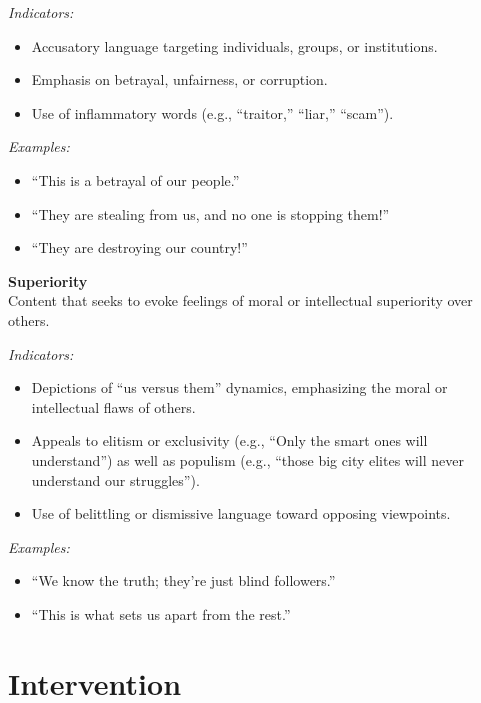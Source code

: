\documentclass[12pt]{article}
\begin{document}
\textit{Indicators:}
\begin{itemize}
    \item Accusatory language targeting individuals, groups, or institutions.
    \item Emphasis on betrayal, unfairness, or corruption.
    \item Use of inflammatory words (e.g., ``traitor,'' ``liar,'' ``scam'').
\end{itemize}

\textit{Examples:}
\begin{itemize}
    \item ``This is a betrayal of our people.''
    \item ``They are stealing from us, and no one is stopping them!''
    \item ``They are destroying our country!''
\end{itemize}



\textbf{Superiority}\\
Content that seeks to evoke feelings of moral or intellectual superiority over others.

\textit{Indicators:}
\begin{itemize}
    \item Depictions of ``us versus them'' dynamics, emphasizing the moral or intellectual flaws of others.
    \item Appeals to elitism or exclusivity (e.g., ``Only the smart ones will understand'') as well as populism (e.g., ``those big city elites will never understand our struggles'').
    \item Use of belittling or dismissive language toward opposing viewpoints.
\end{itemize}

\textit{Examples:}
\begin{itemize}
    \item ``We know the truth; they're just blind followers.''
    \item ``This is what sets us apart from the rest.''
\end{itemize}









\clearpage
\section{Intervention}\label{appendix:intervention}
\end{document}
